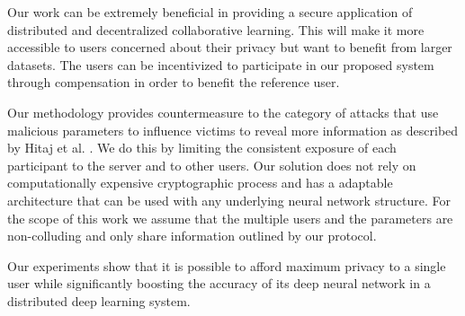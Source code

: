 \documentclass[conference]{IEEEtran}
\begin{document}
Our work can be extremely beneficial in providing a secure application of distributed and decentralized collaborative learning. This
will make it more accessible to users concerned about their privacy but want to benefit from larger datasets. The users can be incentivized to participate in our proposed system through compensation in order to benefit the reference user.

Our methodology provides countermeasure to the category of attacks that use malicious parameters to influence victims to reveal more
information as described  by Hitaj  et al. \cite{hitaj2017deep} . We do this by limiting the consistent exposure of each participant to
the server and to other users. Our solution does not rely on computationally expensive cryptographic process and has a adaptable
architecture that can be used with any underlying neural network structure. For the scope of this work we assume that the multiple
users and the parameters are non-colluding and only share information outlined by our protocol. 

Our experiments show that it is possible to afford maximum privacy to a single user while significantly boosting the accuracy of its deep neural network in a distributed deep learning system.


\end{document}
